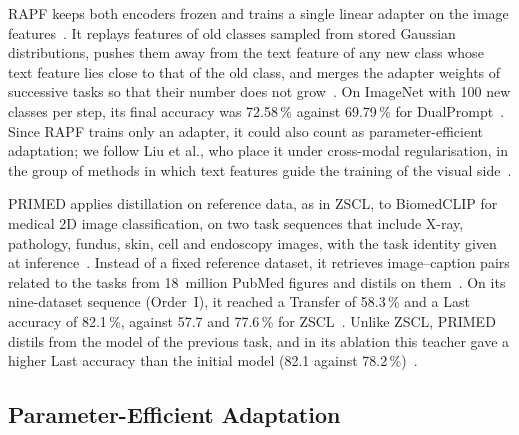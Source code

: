 RAPF keeps both encoders frozen and trains a single linear adapter on the image features~\cite{huang2024classincrementallearningclipadaptive}.
It replays features of old classes sampled from stored Gaussian distributions, pushes them away from the text feature of any new class whose text feature lies close to that of the old class, and merges the adapter weights of successive tasks so that their number does not grow~\cite{huang2024classincrementallearningclipadaptive}.
On ImageNet with 100 new classes per step, its final accuracy was 72.58\,\% against 69.79\,\% for DualPrompt~\cite{huang2024classincrementallearningclipadaptive}.
Since RAPF trains only an adapter, it could also count as parameter-efficient adaptation; we follow Liu et al., who place it under cross-modal regularisation, in the group of methods in which text features guide the training of the visual side~\cite[Sec.~4.2]{liu2026continuallearningvlmssurvey}.

PRIMED applies distillation on reference data, as in ZSCL, to BiomedCLIP for medical 2D image classification, on two task sequences that include X-ray, pathology, fundus, skin, cell and endoscopy images, with the task identity given at inference~\cite{chen2025forgingdynamicmemoryretrievalguided}.
Instead of a fixed reference dataset, it retrieves image--caption pairs related to the tasks from 18~million PubMed figures and distils on them~\cite{chen2025forgingdynamicmemoryretrievalguided}.
On its nine-dataset sequence (Order~I), it reached a Transfer of 58.3\,\% and a Last accuracy of 82.1\,\%, against 57.7 and 77.6\,\% for ZSCL~\cite{chen2025forgingdynamicmemoryretrievalguided}.
Unlike ZSCL, PRIMED distils from the model of the previous task, and in its ablation this teacher gave a higher Last accuracy than the initial model (82.1 against 78.2\,\%)~\cite{chen2025forgingdynamicmemoryretrievalguided}.

\subsection{Parameter-Efficient Adaptation}

